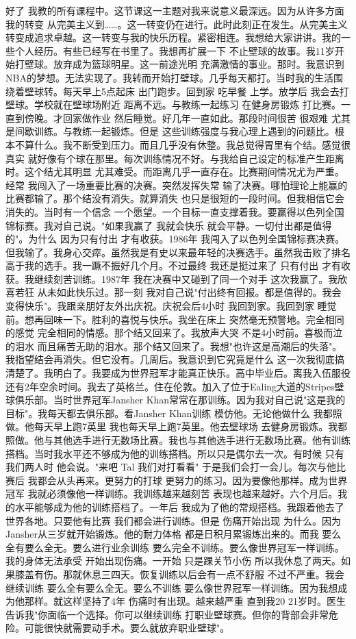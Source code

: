 好了 我教的所有课程中。这节课这一主题对我来说意义最深远。因为从许多方面 我的转变 从完美主义到……。这一转变仍在进行。此时此刻正在发生。从完美主义转变成追求卓越。这一转变与我的快乐历程。紧密相连。我想给大家讲讲。我的一些个人经历。有些已经写在书里了。我想再扩展一下 不止壁球的故事。我11岁开始打壁球。放弃成为篮球明星。这一前途光明 充满激情的事业。那时。我意识到NBA的梦想。无法实现了。我转而开始打壁球。几乎每天都打。当时我的生活围绕着壁球转。每天早上5点起床 出门跑步。回到家 吃早餐 上学。放学后 我会去打壁球。学校就在壁球场附近 距离不远。与教练一起练习 在健身房锻炼 打比赛。一直到傍晚。才回家做作业 然后睡觉。好几年一直如此。那段时间很苦 很艰难 尤其是间歇训练。与教练一起锻炼。但是 这些训练强度与我心理上遇到的问题比。根本不算什么。我不断受到压力。而且几乎没有休整。我总觉得胃里有个结。感觉很真实 就好像有个球在那里。每次训练情况不好。与我给自己设定的标准产生距离时。这个结尤其明显 尤其难受。而距离几乎一直存在。比赛期间情况尤为严重。经常 我闯入了一场重要比赛的决赛。突然发挥失常 输了决赛。哪怕理论上能赢的比赛都输了。那个结没有消失。就算消失 也只是很短的一段时间。但我相信它会消失的。当时有一个信念 一个愿望。一个目标一直支撑着我。要赢得以色列全国锦标赛。我对自己说。"如果我赢了 我就会快乐 就会平静。一切付出都是值得的"。为什么 因为只有付出 才有收获。1986年 我闯入了以色列全国锦标赛决赛。但我输了。我身心交瘁。虽然我是有史以来最年轻的决赛选手。虽然我击败了排名高于我的选手。我一蹶不振好几个月。不过最终 我还是挺过来了 只有付出 才有收获。我继续刻苦训练。1987年 我在决赛中又碰到了同一个对手 这次我赢了。我欣喜若狂 从未如此快乐过。那一刻 我对自己说"付出终有回报。都是值得的。我会变得快乐"。我跟亲朋好友外出庆祝。庆祝会后4小时 我回到家。我回到家 睡觉前。想再回味一下。胜利的喜悦与快乐。我坐在床上 突然毫无预警地。完全相同的感觉 完全相同的情感。那个结又回来了。我放声大哭 不是4小时前。喜极而泣的泪水 而且痛苦无助的泪水。那个结又回来了。我想"也许这是高潮后的失落"。我指望结会再消失。但它没有。几周后。我意识到它究竟是什么 这一次我彻底搞清楚了。我明白了。我要成为世界冠军才能真正快乐。高中毕业后。离我入伍服役还有2年空余时间。我去了英格兰。住在伦敦。加入了位于Ealing大道的Stripes壁球俱乐部。当时世界冠军Jansher Khan常常在那训练。因为我对自己说"这是我的目标"。我每天都去俱乐部。看Jansher Khan训练 模仿他。无论他做什么 我都照做。他每天早上跑7英里 我也每天早上跑7英里。他去壁球场 去健身房锻炼。我都照做。他与其他选手进行无数场比赛。我也与其他选手进行无数场比赛。他有训练搭档。当时我水平还不够成为他的训练搭档。所以只是偶尔去一次。有时候 只有我们两人时 他会说。"来吧 Tal 我们对打看看" 于是我们会打一会儿。每次与他比赛后 我都会从头再来。更努力的打球 更努力的练习。因为要像他那样。成为世界冠军 我就必须像他一样训练。我训练越来越刻苦 表现也越来越好。六个月后。我的水平能够成为他的训练搭档了。一年后 我成为了他的常规搭档。我跟着他去了世界各地。只要他有比赛 我们都会进行训练。但是 伤痛开始出现 为什么。因为Jansher从三岁就开始锻炼。他的耐力体格 都是日积月累锻炼出来的。而我 要么全有要么全无。要么进行业余训练 要么完全不训练。要么像世界冠军一样训练。我的身体无法承受 开始出现伤痛。一开始 只是踝关节小伤 所以我休息了两天。如果膝盖有伤。那就休息三四天。恢复训练以后会有一点不舒服 不过不严重。我会继续训练 要么全有要么全无。要么不训练 要么像世界冠军一样训练。因为我想成为他那样。就这样坚持了4年 伤痛时有出现。越来越严重 直到我20 21岁时。医生告诉我"你面临一个选择。你可以继续训练 打职业壁球赛。但你的背部会非常危险。可能很快就需要动手术。要么就放弃职业壁球"。 

